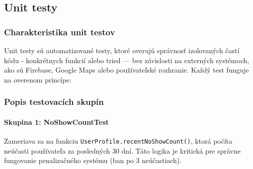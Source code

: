 \subsection{Unit testy}

\subsubsection{Charakteristika unit testov}
Unit testy sú automatizované testy, ktoré overujú správnosť izolovaných častí kódu 
- konkrétnych funkcií alebo tried — bez závislosti na externých systémoch,
 ako sú Firebase, Google Maps alebo používateľské rozhranie. Každý test funguje na overenom princípe:


  \subsubsection{Popis testovacích skupín}

  \paragraph{Skupina 1: NoShowCountTest}
  Zameriava sa na funkciu \texttt{UserProfile.recentNoShowCount()}, ktorá počíta neúčasti používateľa za posledných 30 dní. Táto logika je kritická pre správne fungovanie penalizačného systému (ban po 3 neúčastiach).

